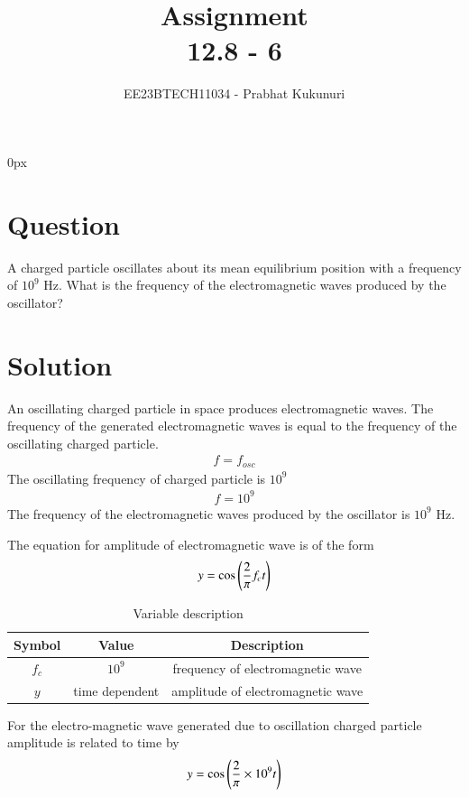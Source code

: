 \documentclass[journal,12pt,twocolumn]{IEEEtran}
\theoremstyle{remark}
\begin{document}
\parindent 0px


\title{Assignment\\[1ex]12.8 - 6}
\author{EE23BTECH11034 - Prabhat Kukunuri$^{}$%
}
\maketitle
\newpage
\bigskip

\renewcommand{\thefigure}{\theenumi}
\renewcommand{\thetable}{\theenumi}
\section*{Question}
A charged particle oscillates about its mean equilibrium position with a frequency of $10^9$ Hz. What is the frequency of the electromagnetic waves produced by the oscillator?

\section*{Solution}
An oscillating charged particle in space produces electromagnetic waves. The frequency of the generated electromagnetic waves is equal to the frequency of the oscillating charged particle.
\begin{align}
    f = f_{osc}
\end{align}
The oscillating frequency of charged particle is $10^9$
\begin{align}
    f = 10^9
\end{align}
The frequency of the electromagnetic waves produced by the oscillator is $10^9$ Hz.

The equation for amplitude of electromagnetic wave is of the form 
\begin{align}
    y = \cos\left({\dfrac{2}{\pi}f_ct}\right)
\end{align}
\begin{table}[h]
    \centering
    \begin{tabular}{|c|c|c|}
    \hline
   Symbol&Value&Description\\ \hline
   $f_c$&$10^9$&frequency of electromagnetic wave\\ \hline
   $y$&time dependent&amplitude of electromagnetic wave\\ \hline
    \end{tabular}
    \caption{Variable description}
    \label{tab:12.8.6.1}
\end{table}

For the electro-magnetic wave generated due to oscillation charged particle amplitude is related to time by
\begin{align}
    y = \cos\left({\dfrac{2}{\pi}\times 10^9 t}\right)
\end{align}
\end{document}
